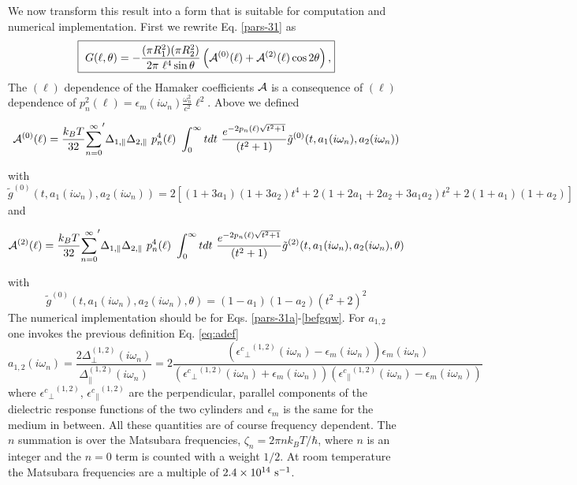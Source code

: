 \documentclass[onecolumn,letterpaper,amsmath,amssymb,floatfix,aps,superscriptaddress]{revtex4}
\begin{document}
We now transform this result into a form that is suitable for computation and numerical implementation. First we rewrite Eq. \ref{pars-31} as
\begin{equation}
  \fbox{
    $\displaystyle{
G(\ell,\theta) = - \frac{ (\pi R_1^{2})(\pi R_2^{2}) }{2 \pi~\ell^{4} \sin{\theta}} \left( {\cal A}^{(0)}(\ell) + {\cal A}^{(2)}(\ell) \cos 2\theta \right) ,}$}
\label{pars-31a}
\end{equation}
The $(\ell)$ dependence of the Hamaker coefficients $\cal A$ is a consequence of $(\ell)$ dependence of $p_n^{2}(\ell) =  \epsilon_m(i \omega_n) \frac{\omega_n^{2}}{c^{2}} \ell^{2}$. Above we defined
\begin{widetext}
\begin{equation}
{\cal A}^{(0)}(\ell) = \frac{k_BT}{32}  {\sum_{n=0}^{\infty}}' \Delta_{1,\parallel} \Delta_{2,\parallel} ~p_n^{4}(\ell) ~\int_0^{\infty} t dt ~\frac{e^{- 2 p_n(\ell) \sqrt{t^{2} + 1}}}{(t^{2} + 1)} \tilde g^{(0)}(t, a_1(i \omega_n), a_2(i \omega_n))
\end{equation}
\end{widetext}
with
\begin{equation}
\tilde g^{(0)}(t, a_1(i \omega_n), a_2(i \omega_n)) = 2 \left[ (1+3a_1)(1+3a_2) t^{4} + 2 (1+2a_1+2a_2+3a_1a_2) t^{2}  + 2(1+a_1)(1+a_2)\right]
\end{equation}
and
\begin{widetext}
\begin{equation}
{\cal A}^{(2)}(\ell) = \frac{k_BT}{32}  {\sum_{n=0}^{\infty}}' \Delta_{1,\parallel} \Delta_{2,\parallel} ~p_n^{4}(\ell) ~\int_0^{\infty} t dt ~\frac{e^{- 2 p_n(\ell) \sqrt{t^{2} + 1}}}{(t^{2} + 1)} \tilde g^{(2)}(t, a_1(i \omega_n), a_2(i \omega_n), \theta)
\end{equation}
\end{widetext}
with
\begin{equation}
\tilde g^{(0)}(t, a_1(i \omega_n), a_2(i \omega_n), \theta) = (1-a_1)(1-a_2)(t^{2} + 2)^2
\label{befgqw}
\end{equation}
The numerical implementation should be for Eqs. \ref{pars-31a}-\ref{befgqw}. For $a_{1,2}$ one invokes the previous definition Eq. \ref{eq:adef}
\begin{equation}
a_{1,2}(i \omega_n) = \frac{2 \Delta_{\perp}^{(1,2)}(i \omega_n)}{\Delta_{\parallel}^{(1,2)}(i \omega_n)} = 2 \frac{({{\epsilon^{c}}_{\perp}}^{(1,2)}(i \omega_n) -\epsilon_{m}(i \omega_n)) \epsilon_{m}(i \omega_n)}{({{\epsilon^{c}}_{\perp}}^{(1,2)}(i \omega_n)+\epsilon_{m}(i \omega_n)) ({{\epsilon^{c}}_{\parallel}}^{(1,2)}(i \omega_n) -\epsilon_{m}(i \omega_n))}
\label{eq:adef}
\end{equation}
where ${{\epsilon^{c}}_{\perp}}^{(1,2)}$, ${{\epsilon^{c}}_{\parallel}}^{(1,2)}$ are the perpendicular, parallel components of the dielectric response functions of the two cylinders and $\epsilon_{m}$ is the same for the medium in between. All these quantities are of course frequency dependent. The $n$ summation is over the Matsubara frequencies, $\zeta_n = 2\pi n k_BT/\hbar$, where $n$ is an integer and the $n=0$ term is counted with a weight $1/2$. At room temperature the Matsubara frequencies are a multiple of $\rm 2.4 \times 10^{14}~s^{-1}$.
\end{document}

